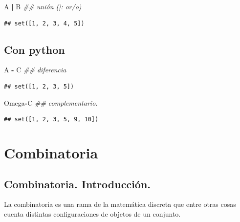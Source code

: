 \documentclass[]{book}
\newenvironment{Shaded}{\begin{snugshade}}{\end{snugshade}}
\newcommand{\CommentTok}[1]{\textcolor[rgb]{0.56,0.35,0.01}{\textit{#1}}}
\newcommand{\NormalTok}[1]{#1}
\newcommand{\OperatorTok}[1]{\textcolor[rgb]{0.81,0.36,0.00}{\textbf{#1}}}
\begin{document}
\begin{Shaded}
\begin{Highlighting}[]
\NormalTok{A }\OperatorTok{|}\NormalTok{ B   }\CommentTok{## unión (|: or/o)}
\end{Highlighting}
\end{Shaded}

\begin{verbatim}
## set([1, 2, 3, 4, 5])
\end{verbatim}

\hypertarget{con-python-3}{%
\subsection{Con python}\label{con-python-3}}

\begin{Shaded}
\begin{Highlighting}[]
\NormalTok{A }\OperatorTok{-}\NormalTok{ C   }\CommentTok{## diferencia }
\end{Highlighting}
\end{Shaded}

\begin{verbatim}
## set([1, 2, 3, 5])
\end{verbatim}

\begin{Shaded}
\begin{Highlighting}[]
\NormalTok{Omega}\OperatorTok{-}\NormalTok{C }\CommentTok{## complementario.}
\end{Highlighting}
\end{Shaded}

\begin{verbatim}
## set([1, 2, 3, 5, 9, 10])
\end{verbatim}

\hypertarget{combinatoria}{%
\section{Combinatoria}\label{combinatoria}}

\hypertarget{combinatoria.-introducciuxf3n.}{%
\subsection{Combinatoria. Introducción.}\label{combinatoria.-introducciuxf3n.}}

La combinatoria es una rama de la matemática discreta que entre otras cosas cuenta distintas configuraciones de objetos de un conjunto.
\end{document}
